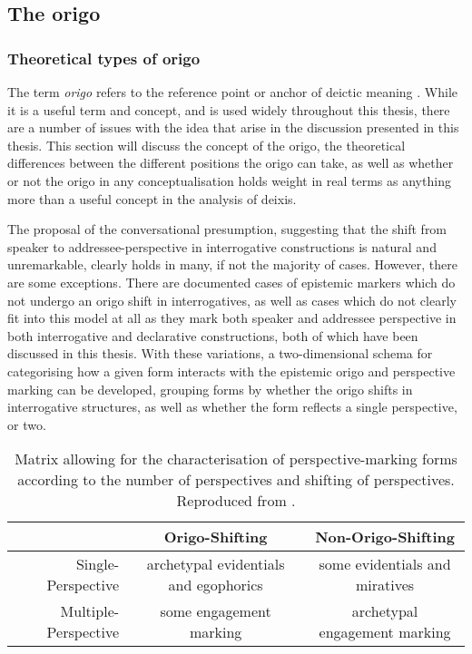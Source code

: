 \subsection{The origo}\label{ss:Discussion:Origo}
\subsubsection{Theoretical types of origo}
The term \textit{origo} refers to the reference point or anchor of deictic meaning \cite{Garrett2001}. While it is a useful term and concept, and is used widely throughout this thesis, there are a number of issues with the idea that arise in the discussion presented in this thesis. This section will discuss the concept of the origo, the theoretical differences between the different positions the origo can take, as well as whether or not the origo in any conceptualisation holds weight in real terms as anything more than a useful concept in the analysis of deixis.

The proposal of the conversational presumption, suggesting that the shift from speaker to addressee-perspective in interrogative constructions is natural and unremarkable, clearly holds in many, if not the majority of cases. However, there are some exceptions. There are documented cases of epistemic markers which do not undergo an origo shift in interrogatives, as well as cases which do not clearly fit into this model at all as they mark both speaker and addressee perspective in both interrogative and declarative constructions, both of which have been discussed in this thesis. With these variations, a two-dimensional schema for categorising how a given form interacts with the epistemic origo and perspective marking can be developed, grouping forms by whether the origo shifts in interrogative structures, as well as whether the form reflects a single perspective, or two.

\begin{table}
    \caption{Matrix allowing for the characterisation of perspective-marking forms according to the number of perspectives and shifting of perspectives. Reproduced from .}
    \label{t:Discussion:OrigoShift}
    \begin{tabular}{r c c}
        \hline
                             & Origo-Shifting                        & Non-Origo-Shifting             \\ \hline
        Single-Perspective   & archetypal evidentials and egophorics & some evidentials and miratives \\
        Multiple-Perspective & some engagement marking               & archetypal engagement marking  \\ \hline
    \end{tabular}

\end{table}

